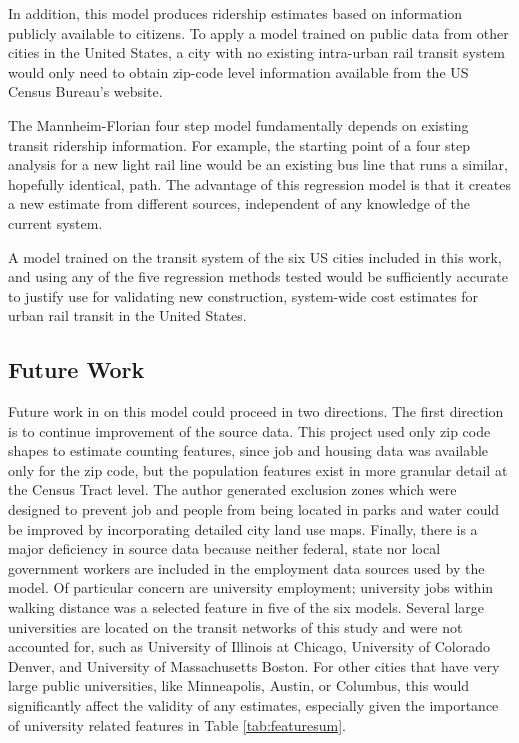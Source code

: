 \documentclass[11pt]{article}
\begin{document}
In addition, this model produces ridership estimates based on information publicly available to citizens. To apply a model trained on public data from other cities in the United States, a city with no existing intra-urban rail transit system would only need to obtain zip-code level information available from the US Census Bureau's website. 

The Mannheim-Florian four step model fundamentally depends on existing transit ridership information. For example, the starting point of a four step analysis for a new light rail line would be an existing bus line that runs a similar, hopefully identical, path. The advantage of this regression model is that it creates a new estimate from different sources, independent of any knowledge of the current system.

A model trained on the transit system of the six US cities included in this work, and using any of the five regression methods tested would be sufficiently accurate to justify use for validating new construction, system-wide cost estimates for urban rail transit in the United States. 

\subsection{Future Work}

Future work in on this model could proceed in two directions. The first direction is to continue improvement of the source data. This project used only zip code shapes to estimate counting features, since job and housing data was available only for the zip code, but the population features exist in more granular detail at the Census Tract level. The author generated exclusion zones which were designed to prevent job and people from being located in parks and water could be improved by incorporating detailed city land use maps. Finally, there is a major deficiency in source data because neither federal, state nor local government workers are included in the employment data sources used by the model. Of particular concern are university employment; university jobs within walking distance was a selected feature in five of the six models. Several large universities are located on the transit networks of this study and were not accounted for, such as University of Illinois at Chicago, University of Colorado  Denver, and University of Massachusetts Boston. For other cities that have very large public universities, like Minneapolis, Austin, or Columbus, this would significantly affect the validity of any estimates, especially given the importance of university related features in Table \ref{tab:featuresum}.
\end{document}
